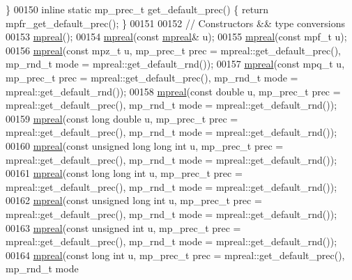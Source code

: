 \begin{DoxyCode}
             \}
00150     \textcolor{keyword}{inline} \textcolor{keyword}{static} mp\_prec\_t  get\_default\_prec()   \{    \textcolor{keywordflow}{return} mpfr\_get\_default\_prec();                     
             \}
00151 
00152     \textcolor{comment}{// Constructors && type conversions}
00153     \hyperlink{classmpfr_1_1mpreal}{mpreal}();
00154     \hyperlink{classmpfr_1_1mpreal}{mpreal}(\textcolor{keyword}{const} \hyperlink{classmpfr_1_1mpreal}{mpreal}& u);
00155     \hyperlink{classmpfr_1_1mpreal}{mpreal}(\textcolor{keyword}{const} mpf\_t u);
00156     \hyperlink{classmpfr_1_1mpreal}{mpreal}(\textcolor{keyword}{const} mpz\_t u,                  mp\_prec\_t prec = mpreal::get\_default\_prec(), mp\_rnd\_t mode
       = mpreal::get\_default\_rnd());
00157     \hyperlink{classmpfr_1_1mpreal}{mpreal}(\textcolor{keyword}{const} mpq\_t u,                  mp\_prec\_t prec = mpreal::get\_default\_prec(), mp\_rnd\_t mode
       = mpreal::get\_default\_rnd());
00158     \hyperlink{classmpfr_1_1mpreal}{mpreal}(\textcolor{keyword}{const} \textcolor{keywordtype}{double} u,                 mp\_prec\_t prec = mpreal::get\_default\_prec(), mp\_rnd\_t mode
       = mpreal::get\_default\_rnd());
00159     \hyperlink{classmpfr_1_1mpreal}{mpreal}(\textcolor{keyword}{const} \textcolor{keywordtype}{long} \textcolor{keywordtype}{double} u,            mp\_prec\_t prec = mpreal::get\_default\_prec(), mp\_rnd\_t mode
       = mpreal::get\_default\_rnd());
00160     \hyperlink{classmpfr_1_1mpreal}{mpreal}(\textcolor{keyword}{const} \textcolor{keywordtype}{unsigned} \textcolor{keywordtype}{long} \textcolor{keywordtype}{long} \textcolor{keywordtype}{int} u, mp\_prec\_t prec = mpreal::get\_default\_prec(), mp\_rnd\_t mode
       = mpreal::get\_default\_rnd());
00161     \hyperlink{classmpfr_1_1mpreal}{mpreal}(\textcolor{keyword}{const} \textcolor{keywordtype}{long} \textcolor{keywordtype}{long} \textcolor{keywordtype}{int} u,          mp\_prec\_t prec = mpreal::get\_default\_prec(), mp\_rnd\_t mode
       = mpreal::get\_default\_rnd());
00162     \hyperlink{classmpfr_1_1mpreal}{mpreal}(\textcolor{keyword}{const} \textcolor{keywordtype}{unsigned} \textcolor{keywordtype}{long} \textcolor{keywordtype}{int} u,      mp\_prec\_t prec = mpreal::get\_default\_prec(), mp\_rnd\_t mode
       = mpreal::get\_default\_rnd());
00163     \hyperlink{classmpfr_1_1mpreal}{mpreal}(\textcolor{keyword}{const} \textcolor{keywordtype}{unsigned} \textcolor{keywordtype}{int} u,           mp\_prec\_t prec = mpreal::get\_default\_prec(), mp\_rnd\_t mode
       = mpreal::get\_default\_rnd());
00164     \hyperlink{classmpfr_1_1mpreal}{mpreal}(\textcolor{keyword}{const} \textcolor{keywordtype}{long} \textcolor{keywordtype}{int} u,               mp\_prec\_t prec = mpreal::get\_default\_prec(), mp\_rnd\_t mode

\end{DoxyCode}
